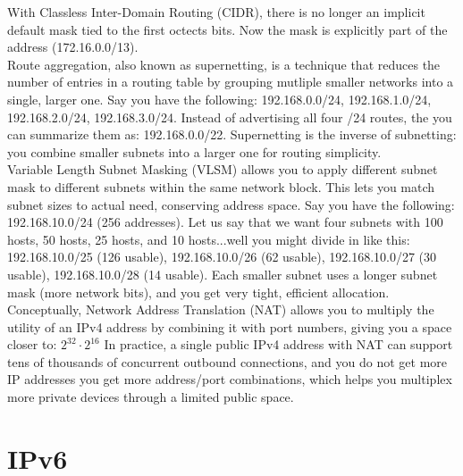 \documentclass{article}
\begin{document}
With Classless Inter-Domain Routing (CIDR), there is no longer an implicit default mask tied to the first octects bits. Now the mask is explicitly part of the address (172.16.0.0/13).\\

Route aggregation, also known as supernetting, is a technique that reduces the number of entries in a routing table by grouping mutliple smaller networks into a single, larger one. Say you have the following: 192.168.0.0/24, 192.168.1.0/24, 192.168.2.0/24, 192.168.3.0/24. Instead of advertising all four /24 routes, the you can summarize them as: 192.168.0.0/22. Supernetting is the inverse of subnetting: you combine smaller subnets into a larger one for routing simplicity.\\

Variable Length Subnet Masking (VLSM) allows you to apply different subnet mask to different subnets within the same network block. This lets you match subnet sizes to actual need, conserving address space. Say you have the following: 192.168.10.0/24 (256 addresses). Let us say that we want four subnets with 100 hosts, 50 hosts, 25 hosts, and 10 hosts...well you might divide in like this: 192.168.10.0/25 (126 usable), 192.168.10.0/26 (62 usable), 192.168.10.0/27 (30 usable), 192.168.10.0/28 (14 usable). Each smaller subnet uses a longer subnet mask (more network bits), and you get very tight, efficient allocation.\\

Conceptually, Network Address Translation (NAT) allows you to multiply the utility of an IPv4 address by combining it with port numbers, giving you a space closer to: $2^{32} \cdot 2^{16}$ In practice, a single public IPv4 address with NAT can support tens of thousands of concurrent outbound connections, and you do not get more IP addresses you get more address/port combinations, which helps you multiplex more private devices through a limited public space.

\section*{IPv6}
 
 
\end{document}

